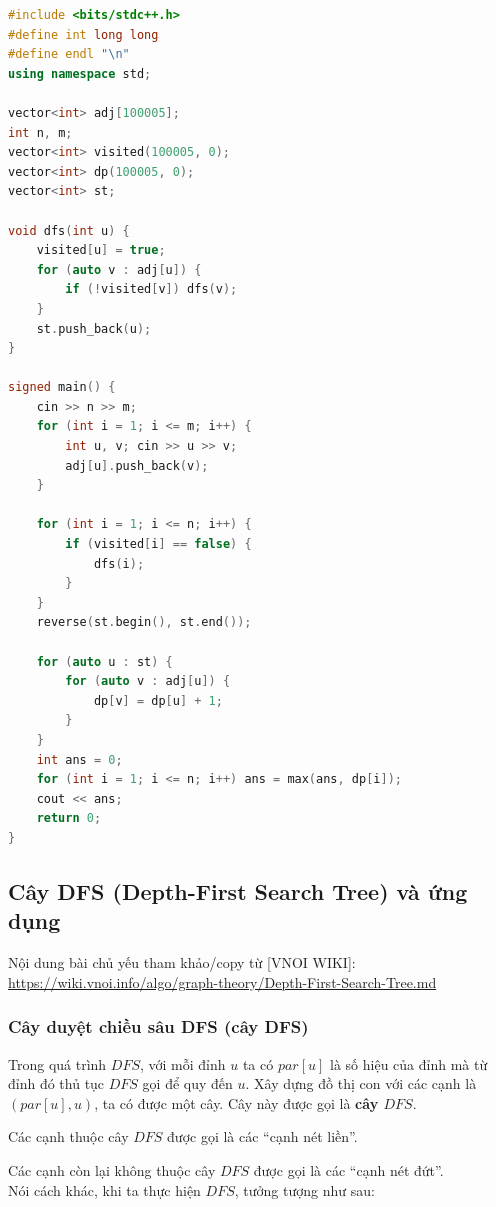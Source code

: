 \documentclass{article}
\begin{document}
\begin{lstlisting}[language=C++, caption={Cài đặt}, label={code:CourseSchedule}]
#include <bits/stdc++.h>
#define int long long
#define endl "\n"
using namespace std;

vector<int> adj[100005];
int n, m; 
vector<int> visited(100005, 0);
vector<int> dp(100005, 0);
vector<int> st;

void dfs(int u) {
    visited[u] = true;
    for (auto v : adj[u]) {
        if (!visited[v]) dfs(v);
    }
    st.push_back(u);
}

signed main() {
    cin >> n >> m;
    for (int i = 1; i <= m; i++) {
        int u, v; cin >> u >> v;
        adj[u].push_back(v);
    }    

    for (int i = 1; i <= n; i++) {
        if (visited[i] == false) {
            dfs(i);
        }
    }
    reverse(st.begin(), st.end());

    for (auto u : st) {
        for (auto v : adj[u]) {
            dp[v] = dp[u] + 1;
        }
    }
    int ans = 0;
    for (int i = 1; i <= n; i++) ans = max(ans, dp[i]);
    cout << ans;
    return 0;
}
\end{lstlisting}

\subsection{Cây DFS (Depth-First Search Tree) và ứng dụng}
Nội dung bài chủ yếu tham khảo/copy từ [VNOI WIKI]: \url{https://wiki.vnoi.info/algo/graph-theory/Depth-First-Search-Tree.md}

\subsubsection{Cây duyệt chiều sâu DFS (cây DFS)}

Trong quá trình $DFS$, với mỗi đỉnh $u$ ta có $par[u]$ là số hiệu của đỉnh mà từ đỉnh đó thủ tục $DFS$ gọi để quy đến $u$. Xây dựng đồ thị con với các cạnh là $(par[u], u)$, ta có được một cây. Cây này được gọi là \textbf{cây $DFS$}.   

Các cạnh thuộc cây $DFS$ được gọi là các ``cạnh nét liền''.

Các cạnh còn lại không thuộc cây $DFS$ được gọi là các ``cạnh nét đứt''.\\

Nói cách khác, khi ta thực hiện $DFS$, tưởng tượng như sau:
\end{document}
